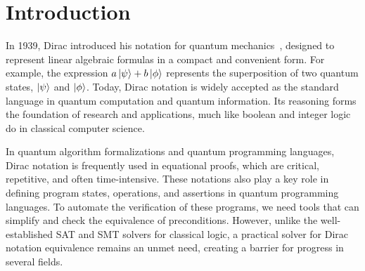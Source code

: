 \documentclass[runningheads]{llncs}
\begin{document}
\newcommand{\Sort}{\mathsf{Sort}}
\newcommand{\WF}{\mathcal{WF}}

\newcommand{\Index}{\mathsf{Index}}
\newcommand{\Type}{\mathsf{Type}}
\newcommand{\Basis}{\mathsf{Basis}}

\newcommand{\SType}{\mathcal{S}}
\newcommand{\KType}{\mathcal{K}}
\newcommand{\BType}{\mathcal{B}}
\newcommand{\OType}{\mathcal{O}}
\newcommand{\SET}{\mathsf{Set}}

\newcommand{\ZEROK}{\mathbf{0}_\mathcal{K}}
\newcommand{\ZEROB}{\mathbf{0}_\mathcal{B}}
\newcommand{\ZEROO}{\mathbf{0}_\mathcal{O}}

\newcommand{\PAIR}{\mathsf{PAIR}}

\newcommand{\ZERO}{\mathsf{0}}
\newcommand{\ONE}{\mathsf{1}}
\newcommand{\ADDS}{\mathsf{ADDS}}
\newcommand{\ADD}{\mathsf{ADD}}
\newcommand{\MULS}{\mathsf{MULS}}
\newcommand{\MUL}{\mathsf{MUL}}
\newcommand{\CONJ}{\mathsf{CONJ}}
\newcommand{\CJG}{\mathsf{CJG}}
\newcommand{\ADJ}{\mathsf{ADJ}}
\newcommand{\DELTA}{\mathsf{DELTA}}
\newcommand{\DOT}{\mathsf{DOT}}
\newcommand{\SCR}{\mathsf{SCR}}
\newcommand{\TSR}{\mathsf{TSR}}
\newcommand{\KET}{\mathsf{KET}}
\newcommand{\BRA}{\mathsf{BRA}}
\newcommand{\ONEO}{\mathbf{1}_\mathcal{O}}
\newcommand{\OUTER}{\mathsf{OUTER}}
\newcommand{\MULK}{\mathsf{MULK}}
\newcommand{\MULB}{\mathsf{MULB}}
\newcommand{\MULO}{\mathsf{MULO}}


\section{Introduction}

In 1939, Dirac introduced his notation for quantum mechanics~\cite{dirac1939new}, designed to represent linear algebraic formulas in a compact and convenient form. For example, the expression \( a\ket{\psi} + b\ket{\phi} \) represents the superposition of two quantum states, \( \ket{\psi} \) and \( \ket{\phi} \). Today, Dirac notation is widely accepted as the standard language in quantum computation and quantum information. Its reasoning forms the foundation of research and applications, much like boolean and integer logic do in classical computer science.

In quantum algorithm formalizations and quantum programming languages, Dirac notation is frequently used in equational proofs, which are critical, repetitive, and often time-intensive. These notations also play a key role in defining program states, operations, and assertions in quantum programming languages. To automate the verification of these programs, we need tools that can simplify and check the equivalence of preconditions. However, unlike the well-established SAT and SMT solvers for classical logic, a practical solver for Dirac notation equivalence remains an unmet need, creating a barrier for progress in several fields.
\end{document}
